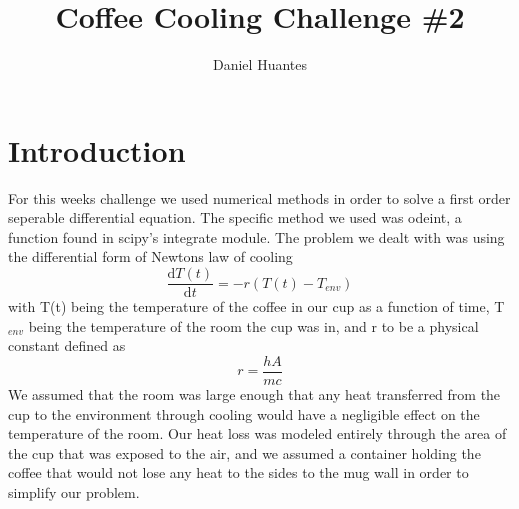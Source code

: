 \documentclass[12pt]{article}
\begin{document}
\title{Coffee Cooling Challenge \#2}
\author{Daniel Huantes}
\twocolumn
\maketitle
\section{Introduction}
For this weeks challenge we used numerical methods in order to solve a first order seperable differential equation. The specific method we used was odeint, a function found in scipy's integrate module. The problem we dealt with was using the differential form of Newtons law of cooling 
\begin{equation}
\frac{\mathrm{d} T(t)}{\mathrm{d} t} = -r (T(t) - T_{env})
\end{equation}
with T(t) being the temperature of the coffee in our cup as a function of time, T$_{env}$ being the temperature of the room the cup was in, and r to be a physical constant defined as 
\begin{equation}
r = \frac{hA}{mc}
\end{equation}
We assumed that the room was large enough that any heat transferred from the cup to the environment through cooling would have a negligible effect on the temperature of the room. Our heat loss was modeled entirely through the area of the cup that was exposed to the air, and we assumed a container holding the coffee that would not lose any heat to the sides to the mug wall in order to simplify our problem.
\end{document}
